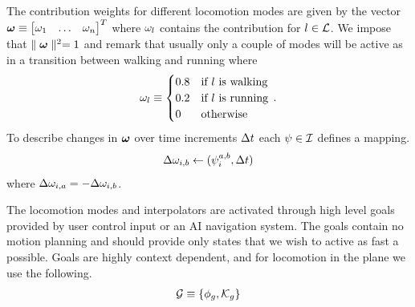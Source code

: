  The contribution weights for different locomotion modes are given by the vector $\boldsymbol{\omega } \equiv \begin{bmatrix}\omega_1 & \ldots & \omega_n \end{bmatrix}^T$ where $\omega_l$ contains the contribution for $l \in \mathcal{L}$. We impose that $\parallel {  \boldsymbol{\omega }  } \parallel^2 = 1$ and remark that usually only a couple of modes will be active as in a transition between walking and running where 
\begin{equation}
    \label{eq:contribusion:weight:example}
    \omega_l \equiv
    \begin{cases}
    0.8 & \text{if $l$ is walking} \\
    0.2 & \text{if $l$ is running} \\
    0 & \text{otherwise}
    \end{cases}\,.
\end{equation}
To describe changes in $\boldsymbol{\omega }$ over time increments $\Delta{t}$ each $\psi \in \mathcal{I}$ defines a mapping. 
\begin{equation}
\Delta{ \omega }_{i,b} \leftarrow (\psi_{i}^{a,b},\Delta{t})
\end{equation}
where $\Delta{ \omega }_{i,a}=-\Delta{ \omega }_{i,b}$. 

The locomotion modes and interpolators are activated through high level goals provided by user control input or an AI navigation system. The goals contain no motion planning and should provide only states that we wish to active as fast a possible. Goals are highly context dependent, and for locomotion in the plane we use the following.
\begin{subequations}
\begin{align}
     \mathcal{G} &\equiv \left\{ \phi_g, \mathcal{K}_g \right\} \label{eq:goals:def} \\
\end{align}
\end{subequations}

